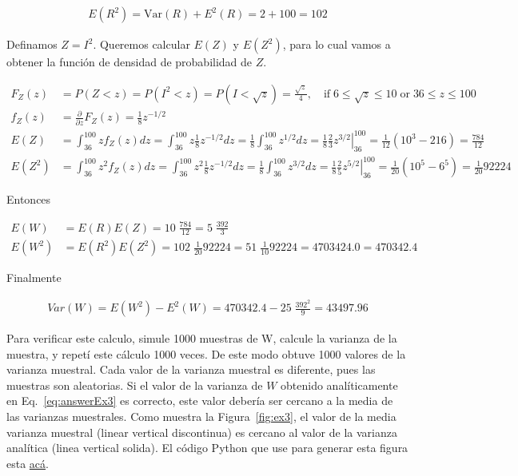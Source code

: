\documentclass[10pt]{article}
\begin{document}
\begin{align*}
    E(R^2)=\text{Var}(R)+E^2(R)=2+100=102
\end{align*}

Definamos $Z=I^2$. Queremos calcular $E(Z)$ y $E(Z^2)$, para lo cual vamos a
obtener la función de densidad de probabilidad de $Z$.

\begin{align}
    F_Z(z)&=P(Z<z)=P(I^2<z)=P(I<\sqrt{z})=\frac{\sqrt{z}}{4},\quad\text{if}\;6\le\sqrt{z}\le
    10\;\text{or}\;36\le z\le 100\nonumber\\
    f_Z(z)&=\frac{\partial}{\partial z}F_Z(z)=\frac{1}{8}z^{-1/2}\nonumber\\
    E(Z)&=\int_{36}^{100}zf_Z(z)dz=\int_{36}^{100}z\frac{1}{8}z^{-1/2}dz=\frac{1}{8}\int_{36}^{100}z^{1/2}dz=\frac{1}{8}\frac{2}{3}\left.z^{3/2}\right|_{36}^{100}=\frac{1}{12}(10^3-216)=\frac{784}{12}\label{eq:EZ}\\
    E(Z^2)&=\int_{36}^{100}z^2f_Z(z)dz=\int_{36}^{100}z^2\frac{1}{8}z^{-1/2}dz=\frac{1}{8}\int_{36}^{100}z^{3/2}dz=\frac{1}{8}\frac{2}{5}\left.z^{5/2}\right|_{36}^{100}=\frac{1}{20}(10^5-6^5)=\frac{1}{20}92224\label{eq:EZ2}
\end{align}

Entonces

\begin{align*}
    E(W)&=E(R)E(Z)=10\;\frac{784}{12}=5\;\frac{392}{3}\\
    E(W^2)&=E(R^2)E(Z^2)=102\;\frac{1}{20}92224=51\;\frac{1}{10}92224=4703424.0=470342.4
\end{align*}

Finalmente

\begin{align}
    Var(W)=E(W^2)-E^2(W)=470342.4-25\;\frac{392^2}{9}=43497.96
    \label{eq:answerEx3}
\end{align}

Para verificar este calculo, simule 1000 muestras de W, calcule la
varianza de la muestra, y repetí este cálculo 1000 veces. De este modo obtuve 1000
valores de la varianza muestral. Cada valor de la varianza muestral es
diferente, pues las muestras son aleatorias. Si el valor de la varianza de $W$
obtenido analíticamente en Eq.~\ref{eq:answerEx3} es correcto, este valor
debería ser cercano a la media de las varianzas muestrales. Como muestra la
Figura~\ref{fig:ex3}, el valor de la media varianza muestral (linear vertical
discontinua) es cercano al valor de la varianza analítica (linea vertical
solida). El código Python que use para generar esta figura esta
\href{http://www.gatsby.ucl.ac.uk/~rapela/tmp/doEx3.py}{acá}.
\end{document}
